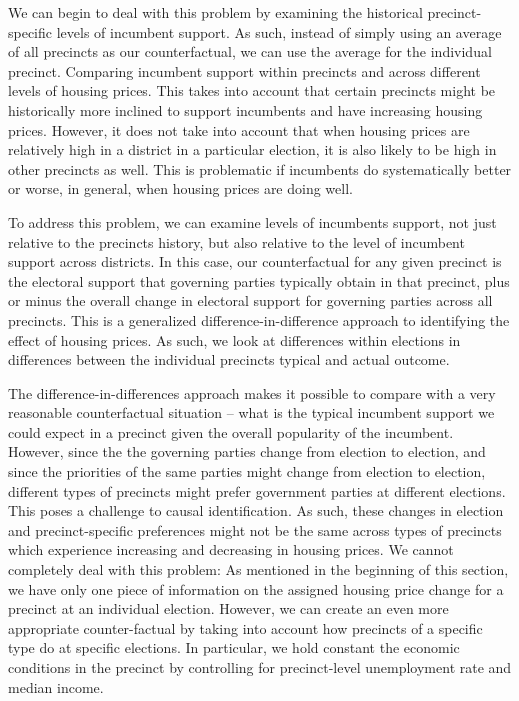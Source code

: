 \documentclass[12pt,a4paper]{article}
\begin{document}
	We can begin to deal with this problem by examining the historical precinct-specific levels of incumbent support. As such, instead of simply using an average of all precincts as our counterfactual, we can use the average for the individual precinct. Comparing incumbent support within precincts and across different levels of housing prices. This takes into account that certain precincts might be historically more inclined to support incumbents and have increasing housing prices. However, it does not take into account that when housing prices are relatively high in a district in a particular election, it is also likely to be high in other precincts as well. This is problematic if incumbents do systematically better or worse, in general, when housing prices are doing well.
	
	To address this problem, we can examine levels of incumbents support, not just relative to the precincts history, but also relative to the level of incumbent support across districts. In this case, our counterfactual for any given precinct is the electoral support that governing parties typically obtain in that precinct, plus or minus the overall change in electoral support for governing parties across all precincts. This is a generalized difference-in-difference approach to identifying the effect of housing prices. As such, we look at differences within elections in differences between the individual precincts typical and actual outcome.
	
	The difference-in-differences approach makes it possible to compare with a very reasonable counterfactual situation -- what is the typical incumbent support we could expect in a precinct given the overall popularity of the incumbent. However, since the the governing parties change from election to election, and since the priorities of the same parties might change from election to election, different types of precincts might prefer government parties at  different elections. This poses a challenge to causal identification. As such,  these changes in election and precinct-specific preferences might not be the same across types of precincts which experience increasing and decreasing in housing prices. We cannot completely deal with this problem: As mentioned in the beginning of this section, we have only one piece of information on the assigned housing price change for a precinct at an individual election. However, we can create an even more appropriate counter-factual by taking into account how precincts of a specific type do at specific elections. In particular, we hold constant the economic conditions in the precinct by controlling for precinct-level unemployment rate and median income.
	
\end{document}
